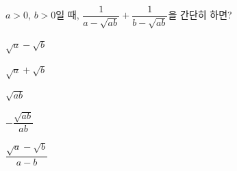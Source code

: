 \hspace*{2mm}\begin{minipage}[t]{\dimexpr\linewidth-2mm\relax}\vspace{0pt}
$a>0$, $b>0$일 때, $\dfrac{1}{a-\sqrt{ab}}+\dfrac{1}{b-\sqrt{ab}}$을 간단히 하면?
\begin{choices32}{\rule[-3ex]{0pt}{8ex}$\sqrt{a}-\sqrt{b}$}{\rule[-3ex]{0pt}{8ex}$\sqrt{a}+\sqrt{b}$}{\rule[-3ex]{0pt}{8ex}$\sqrt{ab}$}{\rule[-3ex]{0pt}{8ex}$-\dfrac{\sqrt{ab}}{ab}$}{\rule[-3ex]{0pt}{8ex}$\dfrac{\sqrt{a}-\sqrt{b}}{a-b}$}\end{choices32}\end{minipage}
